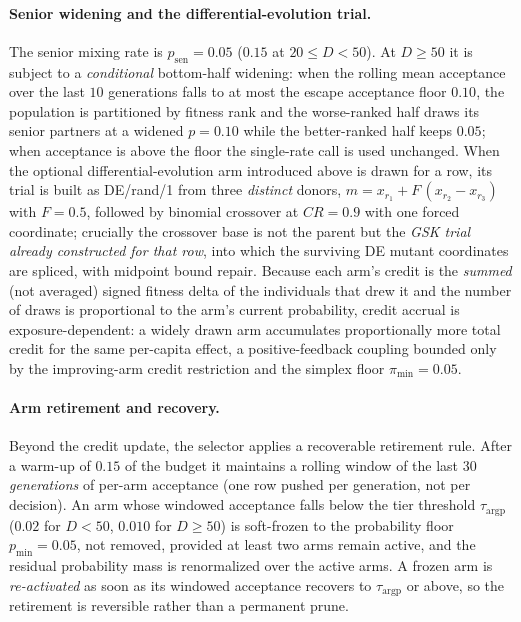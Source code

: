 \documentclass[10pt,a4paper]{article}
\begin{document}
\paragraph{Senior widening and the differential-evolution trial.}
The senior mixing rate is $p_{\mathrm{sen}}=0.05$ ($0.15$ at $20\le D<50$).  At
$D\ge 50$ it is subject to a \emph{conditional} bottom-half widening: when the rolling
mean acceptance over the last $10$ generations falls to at most the escape acceptance
floor $0.10$, the population is partitioned by fitness rank and the worse-ranked half
draws its senior partners at a widened $p=0.10$ while the better-ranked half keeps
$0.05$; when acceptance is above the floor the single-rate call is used unchanged.
When the optional differential-evolution arm introduced above is drawn for a row, its
trial is built as DE/rand/1 from three \emph{distinct} donors,
$m = x_{r_1} + F\,(x_{r_2}-x_{r_3})$ with $F=0.5$, followed by binomial crossover at
$CR=0.9$ with one forced coordinate; crucially the crossover base is not the parent but
the \emph{GSK trial already constructed for that row}, into which the surviving DE
mutant coordinates are spliced, with midpoint bound repair.  Because each arm's credit
is the \emph{summed} (not averaged) signed fitness delta of the individuals that drew
it and the number of draws is proportional to the arm's current probability, credit
accrual is exposure-dependent: a widely drawn arm accumulates proportionally more total
credit for the same per-capita effect, a positive-feedback coupling bounded only by
the improving-arm credit restriction and the simplex floor $\pi_{\min}=0.05$.


\paragraph{Arm retirement and recovery.}
Beyond the credit update, the selector applies a recoverable retirement rule.  After a
warm-up of $0.15$ of the budget it maintains a rolling window of the last $30$
\emph{generations} of per-arm acceptance (one row pushed per generation, not per
decision).  An arm whose windowed acceptance falls below the tier threshold
$\tau_{\mathrm{argp}}$ ($0.02$ for $D<50$, $0.010$ for $D\ge 50$) is soft-frozen to the
probability floor $p_{\min}=0.05$, not removed, provided at least two arms remain
active, and the residual probability mass is renormalized over the active arms.  A
frozen arm is \emph{re-activated} as soon as its windowed acceptance recovers to
$\tau_{\mathrm{argp}}$ or above, so the retirement is reversible rather than a permanent
prune.
\end{document}
